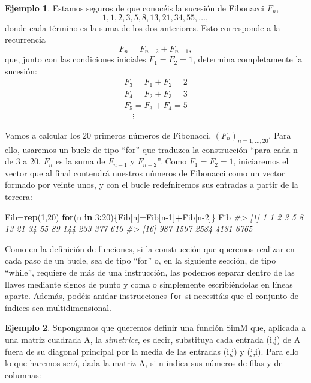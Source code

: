 \documentclass[
]{book}
\newenvironment{Shaded}{\begin{snugshade}}{\end{snugshade}}
\newcommand{\CommentTok}[1]{\textcolor[rgb]{0.56,0.35,0.01}{\textit{#1}}}
\newcommand{\ControlFlowTok}[1]{\textcolor[rgb]{0.13,0.29,0.53}{\textbf{#1}}}
\newcommand{\DecValTok}[1]{\textcolor[rgb]{0.00,0.00,0.81}{#1}}
\newcommand{\KeywordTok}[1]{\textcolor[rgb]{0.13,0.29,0.53}{\textbf{#1}}}
\newcommand{\NormalTok}[1]{#1}
\newcommand{\OperatorTok}[1]{\textcolor[rgb]{0.81,0.36,0.00}{\textbf{#1}}}
\theoremstyle{definition}
\theoremstyle{definition}
\newtheorem{example}{Ejemplo}[chapter]
\theoremstyle{definition}
\theoremstyle{remark}
\begin{document}
\begin{example}
\protect\hypertarget{exm:fib1}{}{\label{exm:fib1} }Estamos seguros de que conocéis la sucesión de Fibonacci \(F_n\),
\[
1, 1, 2, 3, 5, 8, 13, 21, 34, 55, \ldots,
\]
donde cada término es la suma de los dos anteriores. Esto corresponde a la recurrencia
\[
F_{n}=F_{n-2}+F_{n-1},
\]
que, junto con las condiciones iniciales \(F_1=F_2=1\), determina completamente la sucesión:
\[
\begin{array}{l}
F_3=F_1+F_2=2\\
F_4=F_2+F_3=3\\
F_5=F_3+F_4=5\\
\quad\vdots
\end{array}
\]
\end{example}

Vamos a calcular los 20 primeros números de Fibonacci, \((F_n)_{n=1,\ldots,20}\). Para ello, usaremos un bucle de tipo ``for'' que traduzca la construcción ``para cada n de 3 a 20, \(F_n\) es la suma de \(F_{n-1}\) y \(F_{n-2}\)''. Como \(F_1=F_2=1\), iniciaremos el vector que al final contendrá nuestros números de Fibonacci como un vector formado por veinte unos, y con el bucle redefniremos sus entradas a partir de la tercera:

\begin{Shaded}
\begin{Highlighting}[]
\NormalTok{Fib=}\KeywordTok{rep}\NormalTok{(}\DecValTok{1}\NormalTok{,}\DecValTok{20}\NormalTok{) }
\ControlFlowTok{for}\NormalTok{(n }\ControlFlowTok{in} \DecValTok{3}\OperatorTok{:}\DecValTok{20}\NormalTok{)\{Fib[n]=Fib[n}\DecValTok{{-}1}\NormalTok{]}\OperatorTok{+}\NormalTok{Fib[n}\DecValTok{{-}2}\NormalTok{]\} }
\NormalTok{Fib}
\CommentTok{\#\textgreater{}  [1]    1    1    2    3    5    8   13   21   34   55   89  144  233  377  610}
\CommentTok{\#\textgreater{} [16]  987 1597 2584 4181 6765}
\end{Highlighting}
\end{Shaded}

Como en la definición de funciones, si la construcción que queremos realizar en cada paso de un bucle, sea de tipo ``for'' o, en la siguiente sección, de tipo ``while'', requiere de más de una instrucción, las podemos separar dentro de las llaves mediante signos de punto y coma o simplemente escribiéndolas en líneas aparte. Además, podéis anidar instrucciones \texttt{for} si necesitáis que el conjunto de índices sea multidimensional.

\begin{example}
\protect\hypertarget{exm:unnamed-chunk-7}{}{\label{exm:unnamed-chunk-7} }Supongamos que queremos definir una función SimM que, aplicada a una matriz cuadrada A, la \emph{simetrice}, es decir, substituya cada entrada (i,j) de A fuera de su diagonal principal por la media de las entradas (i,j) y (j,i). Para ello lo que haremos será, dada la matriz A, si n indica sus números de filas y de columnas:
\end{example}
\end{document}
